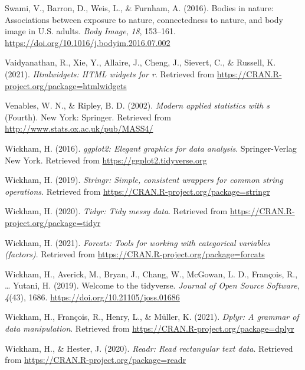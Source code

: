 \documentclass[
  english,
  man, fleqn, noextraspace,floatsintext]{apa6}
\newlength{\cslhangindent}
\newlength{\cslentryspacingunit} %
\newenvironment{CSLReferences}[2] %
 {%
  \setlength{\parindent}{0pt}
  \ifodd #1
  \let\oldpar\par
  \def\par{\hangindent=\cslhangindent\oldpar}
  \fi
  \setlength{\parskip}{#2\cslentryspacingunit}
 }%
 {}
\begin{document}
\begin{CSLReferences}{1}{0}
\leavevmode{}%
Swami, V., Barron, D., Weis, L., \& Furnham, A. (2016). Bodies in nature: {Associations} between exposure to nature, connectedness to nature, and body image in {U}.{S}. adults. \emph{Body Image}, \emph{18}, 153--161. \url{https://doi.org/10.1016/j.bodyim.2016.07.002}

\leavevmode{}%
Vaidyanathan, R., Xie, Y., Allaire, J., Cheng, J., Sievert, C., \& Russell, K. (2021). \emph{Htmlwidgets: HTML widgets for r}. Retrieved from \url{https://CRAN.R-project.org/package=htmlwidgets}

\leavevmode{}%
Venables, W. N., \& Ripley, B. D. (2002). \emph{Modern applied statistics with s} (Fourth). New York: Springer. Retrieved from \url{http://www.stats.ox.ac.uk/pub/MASS4/}

\leavevmode{}%
Wickham, H. (2016). \emph{ggplot2: Elegant graphics for data analysis}. Springer-Verlag New York. Retrieved from \url{https://ggplot2.tidyverse.org}

\leavevmode{}%
Wickham, H. (2019). \emph{Stringr: Simple, consistent wrappers for common string operations}. Retrieved from \url{https://CRAN.R-project.org/package=stringr}

\leavevmode{}%
Wickham, H. (2020). \emph{Tidyr: Tidy messy data}. Retrieved from \url{https://CRAN.R-project.org/package=tidyr}

\leavevmode{}%
Wickham, H. (2021). \emph{Forcats: Tools for working with categorical variables (factors)}. Retrieved from \url{https://CRAN.R-project.org/package=forcats}

\leavevmode{}%
Wickham, H., Averick, M., Bryan, J., Chang, W., McGowan, L. D., François, R., \ldots{} Yutani, H. (2019). Welcome to the {tidyverse}. \emph{Journal of Open Source Software}, \emph{4}(43), 1686. \url{https://doi.org/10.21105/joss.01686}

\leavevmode{}%
Wickham, H., François, R., Henry, L., \& Müller, K. (2021). \emph{Dplyr: A grammar of data manipulation}. Retrieved from \url{https://CRAN.R-project.org/package=dplyr}

\leavevmode{}%
Wickham, H., \& Hester, J. (2020). \emph{Readr: Read rectangular text data}. Retrieved from \url{https://CRAN.R-project.org/package=readr}


\end{CSLReferences}
\end{document}
